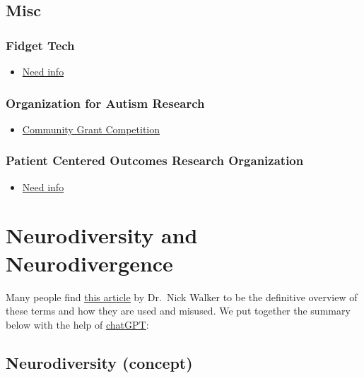 \documentclass[
  letterpaper,
  DIV=11,
  numbers=noendperiod]{scrreprt}
\providecommand{\tightlist}{%
  \setlength{\itemsep}{0pt}\setlength{\parskip}{0pt}}\usepackage{longtable,booktabs,array}
\begin{document}
\section{Misc}\label{misc}

\subsection{Fidget Tech}\label{fidget-tech}

\begin{itemize}
\tightlist
\item
  \href{https://www.fidgetech.org/}{Need info}
\end{itemize}

\subsection{Organization for Autism
Research}\label{organization-for-autism-research}

\begin{itemize}
\tightlist
\item
  \href{https://researchautism.smapply.org/prog/community_grant/}{Community
  Grant Competition}
\end{itemize}

\subsection{Patient Centered Outcomes Research
Organization}\label{patient-centered-outcomes-research-organization}

\begin{itemize}
\tightlist
\item
  \href{https://www.pcori.org/}{Need info}
\end{itemize}

\chapter{Neurodiversity and Neurodivergence}\label{sec-neurodiversity}

Many people find
\href{https://neuroqueer.com/neurodiversity-terms-and-definitions/}{\ul{this
article}} by Dr.~Nick Walker to be the definitive overview of these
terms and how they are used and misused. We put together the summary
below with the help of
\href{https://chatgpt.com/share/e60ffdec-5945-45d2-9a14-2abe39cf4f8d}{\ul{chatGPT}}:

\section{Neurodiversity (concept)}\label{neurodiversity-concept}
\end{document}
